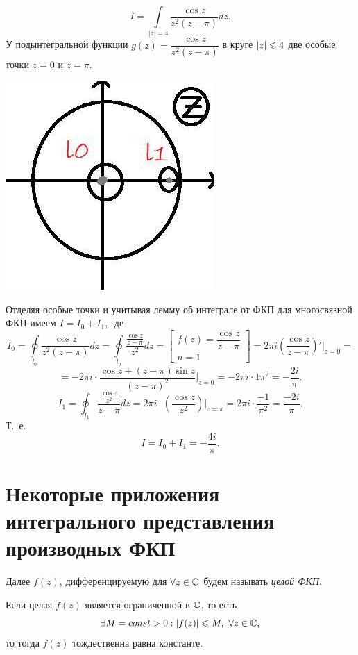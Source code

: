 \documentclass[../../main.tex]{subfiles}
\begin{document}
\begin{exmp}
	\[
	I = \int\limits_{|z|=4}\frac{\cos z}{z^2 (z-\pi)}
	dz.
	\]
	У подынтегральной функции $g(z)=\dfrac{\cos z}
	{z^2(z-\pi)}$ в круге $\left|{z}\right| \leqslant 4$
	две особые точки $z=0$ и $z=\pi$.
	
	\begin{center}
	\includegraphics{lec33_1}
	\end{center}
	
	Отделяя особые точки и учитывая лемму об 
	интеграле от ФКП для многосвязной ФКП имеем 
	$I = I_0 + I_1$, где 
	\[
	I_0 = 
	\oint\limits_{l_0}\dfrac{\cos z}{z^2(z - \pi)} 
	dz=
	\oint\limits_{l_0}\dfrac{\frac{\cos z}
		{z-\pi}}{z^2} dz
	= \left[
	\begin{array}{l}
	f(z) = \dfrac{\cos z}{z-\pi} \\
	n = 1
	\end{array}
	\right] = 
	2\pi i \left( \dfrac{\cos z}{z-\pi}\right)'
	\bigg|_{z=0}=
	\]
	\[= -2\pi i \cdot \dfrac{\cos z + 
		(z - \pi) \sin z}{(z-\pi)^2}\bigg|_{z=0}=
	-2\pi i \cdot {1}{\pi ^2} = -\dfrac{2i}{\pi}.
	\]
	\[
	I_1 = \oint_{l_1} \dfrac{\frac{\cos z}{z^2}}
	{z-\pi} dz = 2 \pi i \cdot \left(
	\dfrac{\cos z}{z^2}
	\right) |_{z=\pi} = 2\pi i \cdot \dfrac{-1}{\pi^2}
	=\dfrac{-2i}{\pi}.
	\]
	Т.~е.
	\[
	I = I_0 + I_1 = -\dfrac{4i}{\pi}.
	\]
\end{exmp}

\section{Некоторые приложения интегрального
	представления производных ФКП}

Далее $f(z)$, дифференцируемую для $\forall z \in \mathbb{C}$
будем называть \emph{целой ФКП}.
\begin{thm}[Лиувилль]
	Если целая $f(z)$ является ограниченной в $\mathbb{C}$,
	то есть
	\begin{equation}
	\label{lec33:11}
	\exists M = const > 0 : \left|{f(z)}\right|
	\leqslant M,\ \forall z \in \mathbb{C}, 
	\end{equation}
	то тогда $f(z)$ тождественна равна константе.
\end{thm}
	
\end{document}
